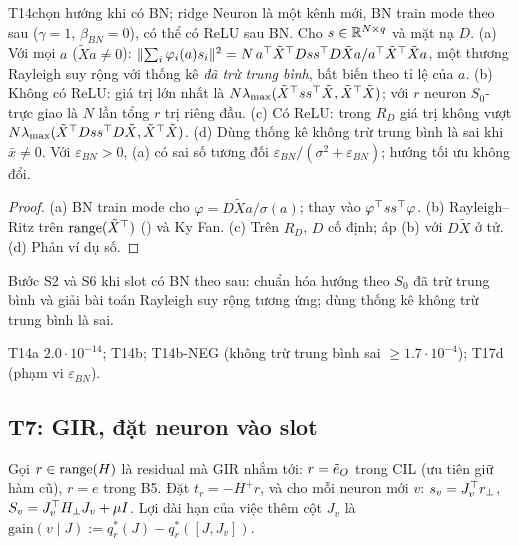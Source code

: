 \begin{namedthm}{T14}{chọn hướng khi có BN; ridge}
Neuron là một kênh mới, BN train mode theo sau ($\gamma=1$, $\beta_{BN}=0$), có thể có ReLU sau BN. Cho $s\in\mathbb{R}^{N\times q}$ và mặt nạ $D$.
(a) Với mọi $a$ ($\tilde Xa\ne0$): $\lVert \sum_i\varphi_i(a)s_i\rVert^2=N\,a^{\top}\tilde X^{\top} Dss^{\top} D\tilde Xa/a^{\top}\tilde X^{\top}\tilde Xa$, một thương Rayleigh suy rộng với thống kê \emph{đã trừ trung bình}, bất biến theo tỉ lệ của $a$.
(b) Không có ReLU: giá trị lớn nhất là $N\lambda_{\max}(\tilde X^{\top} ss^{\top}\tilde X,\tilde X^{\top}\tilde X)$; với $r$ neuron $S_0$-trực giao là $N$ lần tổng $r$ trị riêng đầu.
(c) Có ReLU: trong $R_D$ giá trị không vượt $N\lambda_{\max}(\tilde X^{\top} Dss^{\top} D\tilde X,\tilde X^{\top}\tilde X)$.
(d) Dùng thống kê không trừ trung bình là sai khi $\bar x\ne0$.
Với $\varepsilon_{BN}>0$, (a) có sai số tương đối $\varepsilon_{BN}/(\sigma^2+\varepsilon_{BN})$; hướng tối ưu không đổi.
\end{namedthm}
\begin{proof}
(a) BN train mode cho $\varphi=D\tilde Xa/\sigma(a)$; thay vào $\varphi^{\top} ss^{\top}\varphi$. (b) Rayleigh--Ritz trên $\operatorname{range}(\tilde X^{\top})$ () và Ky Fan. (c) Trên $R_D$, $D$ cố định; áp (b) với $D\tilde X$ ở tử. (d) Phản ví dụ số.
\end{proof}
\begin{hequa}
Bước S2 và S6 khi slot có BN theo sau: chuẩn hóa hướng theo $S_0$ đã trừ trung bình và giải bài toán Rayleigh suy rộng tương ứng; dùng thống kê không trừ trung bình là sai.
\end{hequa}
\begin{kiem}
T14a $2.0\cdot10^{-14}$; T14b; T14b-NEG (không trừ trung bình sai $\ge1.7\cdot10^{-4}$); T17d (phạm vi $\varepsilon_{BN}$).
\end{kiem}

\subsection{T7: GIR, đặt neuron vào slot}

Gọi $r\in\operatorname{range}(H)$ là residual mà GIR nhắm tới: $r=\tilde e_O$ trong CIL (ưu tiên giữ hàm cũ), $r=e$ trong B5. Đặt $t_r=-H^+r$, và cho mỗi neuron mới $v$: $s_v=J_v^{\top}r_{\perp}$, $S_v=J_v^{\top} H_\perp J_v+\mu I$. Lợi dài hạn của việc thêm cột $J_v$ là $\mathrm{gain}(v\mid J):=q^*_r(J)-q^*_r([J,J_v])$.

